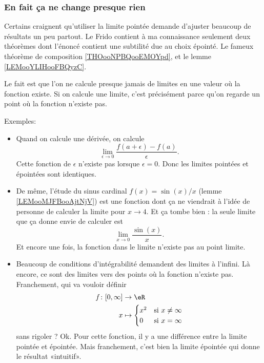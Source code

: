 \subsubsection{En fait ça ne change presque rien}

Certains craignent qu'utiliser la limite pointée demande d'ajuster beaucoup de résultats un peu partout\cite{BIBooTOVWooSDsNrc}. Le Frido contient à ma connaissance seulement deux théorèmes dont l'énoncé contient une subtilité due au choix épointé. Le fameux théorème de composition \ref{THOooNPBQooEMOYpd}, et le lemme \ref{LEMooYLIHooFBQyzC}.

Le fait est que l'on ne calcule presque jamais de limites en une valeur où la fonction existe. Si on calcule une limite, c'est précisément parce qu'on regarde un point où la fonction n'existe pas.

Exemples:
\begin{itemize}
    \item Quand on calcule une dérivée, on calcule
        \begin{equation}
            \lim_{\epsilon\to 0}\frac{ f(a+\epsilon)-f(a) }{ \epsilon }.
        \end{equation}
        Cette fonction de \( \epsilon\) n'existe pas lorsque \( \epsilon=0\). Donc les limites pointées et épointées sont identiques.
    \item
        De même, l'étude du sinus cardinal \( f(x)=\sin(x)/x\) (lemme \ref{LEMooMJFBooAjtNjV}) est une fonction dont ça ne viendrait à l'idée de personne de calculer la limite pour \( x\to 4\). Et ça tombe bien : la seule limite que ça donne envie de calculer est
        \begin{equation}
            \lim_{x\to 0} \frac{ \sin(x) }{ x }.
        \end{equation}
        Et encore une fois, la fonction dans le limite n'existe pas au point limite.
    \item
        Beaucoup de conditions d'intégrabilité demandent des limites à l'infini. Là encore, ce sont des limites vers des points où la fonction n'existe pas. Franchement, qui va vouloir définir
        \begin{equation}
            \begin{aligned}
                f\colon \mathopen[ 0 , \infty \mathclose]&\to \eR \\
                x&\mapsto \begin{cases}
                    x^2    &   \text{si } x\neq \infty\\
                    0    &    \text{si } x=\infty
                \end{cases}
            \end{aligned}
        \end{equation}
        sans rigoler ?  Ok. Pour cette fonction, il y a une différence entre la limite pointée et épointée. Mais franchement, c'est bien la limite épointée qui donne le résultat «intuitif».
\end{itemize}

